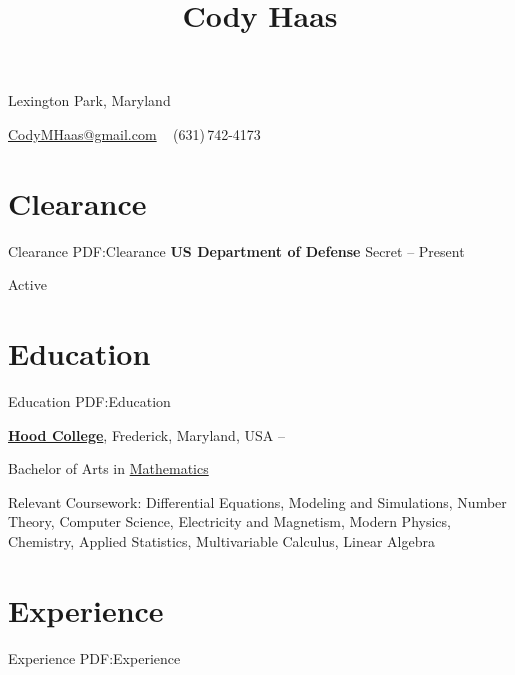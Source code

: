 \documentclass[a4paper,10pt,oneside]{article}
\begin{document}

\title{Cody Haas}

\begin{subtitle}
\large{Lexington Park, Maryland}
\par
\href{mailto:codymhaas@gmail.com}
{CodyMHaas@gmail.com}
\,\BulletSymbol\,
\,(631)\,742-4173
\,
\end{subtitle}
\begin{body}

\section
{Clearance}
{Clearance}
{PDF:Clearance}
{\textbf{US Department of Defense}} Secret
\hfill
{} --
Present
\par
Active
\section
{Education}
{Education}
{PDF:Education}

\href{http://www.hood.edu}
{\textbf{Hood College}},
Frederick, Maryland, USA
\hfill
{} --
\par
Bachelor of Arts in
\href{http://http://www.hood.edu/math/}
{Mathematics}
\begin{detail}
\BulletItem
Relevant Coursework: Differential Equations, Modeling and Simulations, Number Theory, Computer Science, Electricity and Magnetism, Modern Physics, Chemistry, Applied Statistics, Multivariable Calculus, Linear Algebra
\end{detail}

\section
{Experience}
{Experience}
{PDF:Experience}


\end{body}
\end{document}
